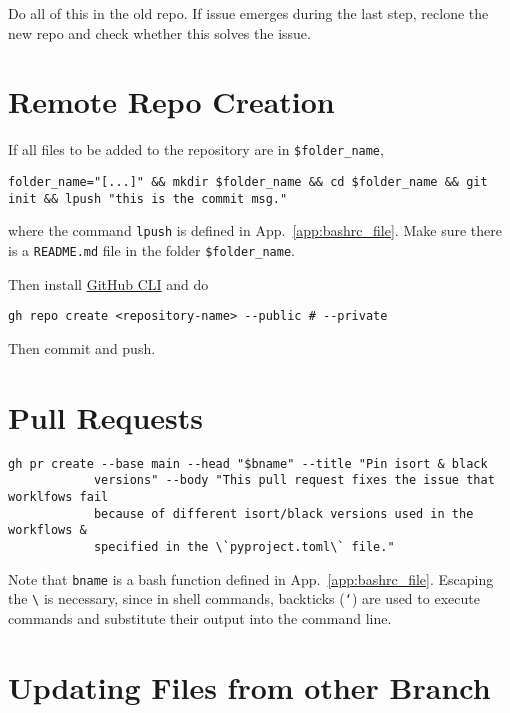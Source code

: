 \documentclass[12pt, a4paper]{scrbook}
\numberwithin{equation}{section}
\theoremstyle{definition}
\theoremstyle{definition}
\begin{document}
		Do all of this in the old repo. If issue emerges during the last step, reclone the new repo and check whether this solves the issue.
	
	\section{Remote Repo Creation}
		
		If all files to be added to the repository are in \texttt{\$folder\_name},
			
		\begin{lstlisting}[style=mystylebash, xleftmargin=\parindent]
			folder_name="[...]" && mkdir $folder_name && cd $folder_name && git init && lpush "this is the commit msg."
		\end{lstlisting}
	
		where the command \texttt{lpush} is defined in App.~\ref{app:bashrc_file}. Make sure there is a \texttt{README.md} file in the folder \texttt{\$folder\_name}.
		
		Then install \href{https://cli.github.com/}{GitHub CLI} and do
		
		\begin{lstlisting}[style=mystylebash, xleftmargin=\parindent]
			gh repo create <repository-name> --public # --private
		\end{lstlisting}
		
		Then commit and push.
		
	\section{Pull Requests}
		
		\begin{lstlisting}[style=mystylebash, xleftmargin=\parindent]
			gh pr create --base main --head "$bname" --title "Pin isort & black 
			versions" --body "This pull request fixes the issue that worklfows fail
			because of different isort/black versions used in the workflows & 
			specified in the \`pyproject.toml\` file."
		\end{lstlisting}
	
		Note that \texttt{bname} is a bash function defined in App.~\ref{app:bashrc_file}. Escaping the \texttt{\textbackslash} is necessary, since in shell commands, backticks (\texttt{`}) are used to execute commands and substitute their output into the command line.
		
	\section{Updating Files from other Branch}	
	
\end{document}

